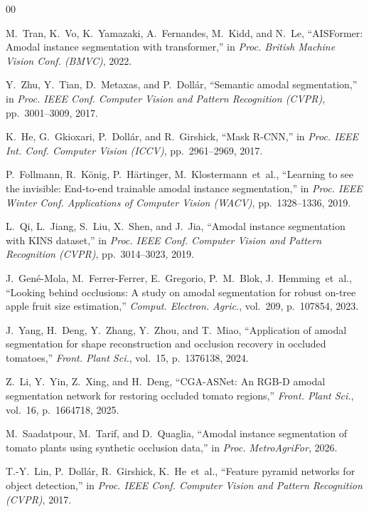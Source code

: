 \documentclass[conference]{IEEEtran}
\begin{document}
\begin{thebibliography}{00}

M.~Tran, K.~Vo, K.~Yamazaki, A.~Fernandes, M.~Kidd, and N.~Le,
``AISFormer: Amodal instance segmentation with transformer,''
in \textit{Proc. British Machine Vision Conf. (BMVC)}, 2022.

Y.~Zhu, Y.~Tian, D.~Metaxas, and P.~Doll{\'a}r,
``Semantic amodal segmentation,''
in \textit{Proc. IEEE Conf. Computer Vision and Pattern Recognition (CVPR)},
pp.~3001--3009, 2017.

K.~He, G.~Gkioxari, P.~Doll{\'a}r, and R.~Girshick,
``Mask R-CNN,''
in \textit{Proc. IEEE Int. Conf. Computer Vision (ICCV)}, pp.~2961--2969, 2017.

P.~Follmann, R.~K{\"o}nig, P.~H{\"a}rtinger, M.~Klostermann~et~al.,
``Learning to see the invisible: End-to-end trainable amodal instance
segmentation,''
in \textit{Proc. IEEE Winter Conf. Applications of Computer Vision (WACV)},
pp.~1328--1336, 2019.

L.~Qi, L.~Jiang, S.~Liu, X.~Shen, and J.~Jia,
``Amodal instance segmentation with KINS dataset,''
in \textit{Proc. IEEE Conf. Computer Vision and Pattern Recognition (CVPR)},
pp.~3014--3023, 2019.

J.~Gen{\'e}-Mola, M.~Ferrer-Ferrer, E.~Gregorio, P.~M.~Blok, J.~Hemming~et~al.,
``Looking behind occlusions: A study on amodal segmentation for robust
on-tree apple fruit size estimation,''
\textit{Comput. Electron. Agric.}, vol.~209, p.~107854, 2023.

J.~Yang, H.~Deng, Y.~Zhang, Y.~Zhou, and T.~Miao,
``Application of amodal segmentation for shape reconstruction and occlusion
recovery in occluded tomatoes,''
\textit{Front. Plant Sci.}, vol.~15, p.~1376138, 2024.

Z.~Li, Y.~Yin, Z.~Xing, and H.~Deng,
``CGA-ASNet: An RGB-D amodal segmentation network for restoring occluded
tomato regions,''
\textit{Front. Plant Sci.}, vol.~16, p.~1664718, 2025.

M.~Saadatpour, M.~Tarif, and D.~Quaglia,
``Amodal instance segmentation of tomato plants using synthetic occlusion
data,''
in \textit{Proc. MetroAgriFor}, 2026.

T.-Y.~Lin, P.~Doll{\'a}r, R.~Girshick, K.~He~et~al.,
``Feature pyramid networks for object detection,''
in \textit{Proc. IEEE Conf. Computer Vision and Pattern Recognition (CVPR)}, 2017.


\end{thebibliography}
\end{document}
